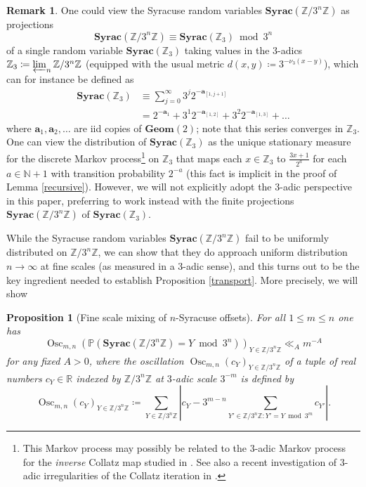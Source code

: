 \documentclass[12pt,a4paper,reqno]{amsart}
\numberwithin{equation}{section}
\theoremstyle{plain}
\newtheorem{proposition}[theorem]{Proposition}
\theoremstyle{definition}
\newtheorem{remark}[theorem]{Remark}
\renewcommand\P{\mathbb{P}}
\newcommand\R{\mathbb{R}}
\newcommand\Z{\mathbb{Z}}
\newcommand\N{\mathbb{N}}
\renewcommand\a{\mathbf{a}}
\newcommand\Geom{\mathbf{Geom}}
\newcommand\Syrac{\mathbf{Syrac}}
\newcommand\Osc{{\operatorname{Osc}}}
\renewcommand{\mod}{\bmod}
\begin{document}
\begin{remark}  One could view the Syracuse random variables $\Syrac(\Z/3^n\Z)$ as projections
$$ \Syrac(\Z/3^n\Z) \equiv \Syrac(\Z_3) \mod 3^n$$
of a single random variable $\Syrac(\Z_3)$ taking values in the $3$-adics $\Z_3 \coloneqq \varprojlim_n \Z/3^n\Z$ (equipped with the usual metric $d(x,y) \coloneqq 3^{-\nu_3(x-y)}$), which can for instance be defined as
\begin{align*}
 \Syrac(\Z_3) &\equiv \sum_{j=0}^\infty 3^j 2^{-\a_{[1,j+1]}}\\
&= 2^{-\a_1} + 3^1 2^{-\a_{[1,2]}} + 3^2 2^{-\a_{[1,3]}} + \dots
\end{align*}
where $\a_1,\a_2,\dots$ are iid copies of $\Geom(2)$; note that this series converges in $\Z_3$.  One can view the distribution of $\Syrac(\Z_3)$ as the unique stationary measure for the discrete Markov process\footnote{This Markov process may possibly be related to the $3$-adic Markov process for the \emph{inverse} Collatz map studied in \cite{wirsch}. See also a recent investigation of $3$-adic irregularities of the Collatz iteration in \cite{thomas}.} on $\Z_3$ that maps each $x \in \Z_3$ to $\frac{3x+1}{2^{a}}$ for each $a \in \N+1$ with transition probability $2^{-a}$ (this fact is implicit in the proof of Lemma \ref{recursive}).  However, we will not explicitly adopt the $3$-adic perspective in this paper, preferring to work instead with the finite projections $\Syrac(\Z/3^n\Z)$ of $\Syrac(\Z_3)$.
\end{remark}

While the Syracuse random variables $\Syrac(\Z/3^n\Z)$ fail to be uniformly distributed on $\Z/3^n \Z$, we can show that they do approach uniform distribution $n \to \infty$ at fine scales (as measured in a $3$-adic sense), and this turns out to be the key ingredient needed to establish
Proposition \ref{transport}.  More precisely, we will show

\begin{proposition}[Fine scale mixing of $n$-Syracuse offsets]\label{tv-bound}  For all $1 \leq m \leq n$ one has
\begin{equation}\label{yal}
\Osc_{m,n} \left( \P( \Syrac(\Z/3^n\Z) = Y \mod 3^n ) \right)_{Y \in \Z/3^n\Z} \ll_A m^{-A}
\end{equation}
for any fixed $A>0$, where the oscillation $\Osc_{m,n}( c_Y )_{Y \in \Z/3^n\Z}$ of a tuple of real numbers $c_Y \in \R$ indexed by $\Z/3^n\Z$ at $3$-adic scale $3^{-m}$ is defined by
\begin{equation}\label{osc-def}
 \Osc_{m,n}( c_Y )_{Y \in \Z/3^n\Z} \coloneqq \sum_{Y \in \Z/3^n\Z} \left| c_Y - 3^{m-n} \sum_{Y' \in \Z/3^n\Z: Y' = Y \mod 3^m} c_{Y'} \right|.
\end{equation}
\end{proposition}
\end{document}
